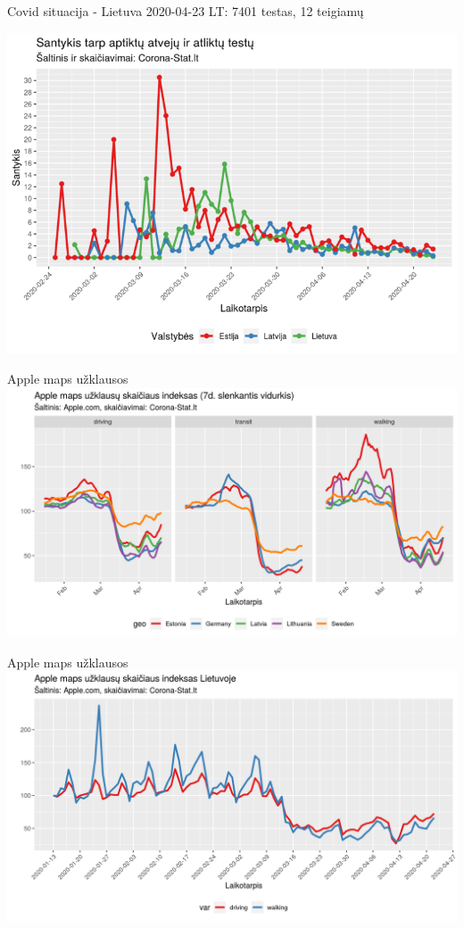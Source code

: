 \documentclass[aspectratio=169, 11pt]{beamer}
\begin{document}
\begin{frame}{Covid situacija - Lietuva}
2020-04-23 LT: 7401 testas, 12 teigiamų

\centering
\includegraphics[scale=0.375]{balt.png}
\end{frame}

\begin{frame}{Apple maps užklausos}
\centering
\includegraphics[scale=0.575]{apple_judejimas.png}
\end{frame}

\begin{frame}{Apple maps užklausos}
\centering
\includegraphics[scale=0.575]{apple_judejimas_lt.png}
\end{frame}
\end{document}
